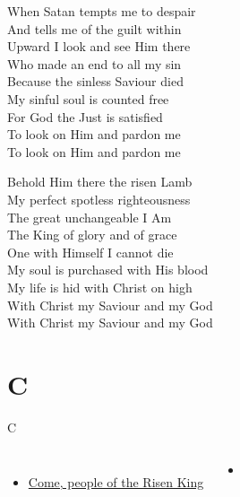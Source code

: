 \documentclass{beamer}
\begin{document}
{\begin{frame}{}
When Satan tempts me to despair\\ 
And tells me of the guilt within\\ 
Upward I look and see Him there\\ 
Who made an end to all my sin\\ 
Because the sinless Saviour died\\ 
My sinful soul is counted free\\ 
For God the Just is satisfied\\ 
To look on Him and pardon me\\ 
To look on Him and pardon me 

\end{frame}

\hypertarget{Before the throne of God above[]3}{}
\begin{frame}{}
\fontsize{ 15 }{ 19 }\selectfont

Behold Him there the risen Lamb\\ 
My perfect spotless righteousness\\ 
The great unchangeable I Am\\ 
The King of glory and of grace\\ 
One with Himself I cannot die\\ 
My soul is purchased with His blood\\ 
My life is hid with Christ on high\\ 
With Christ my Saviour and my God\\ 
With Christ my Saviour and my God 

\end{frame}

}
 
\section{C}

\begin{frame}{C}
\begin{columns}
        \begin{itemize}
    \item \hyperlink{Come, people of the Risen King[]}{Come, people of the Risen King } \phantom{ 1 1}
\end{itemize}
        \begin{itemize}
            \item[] \phantom{1}\end{itemize}


\end{columns}

\end{frame}
\end{document}
